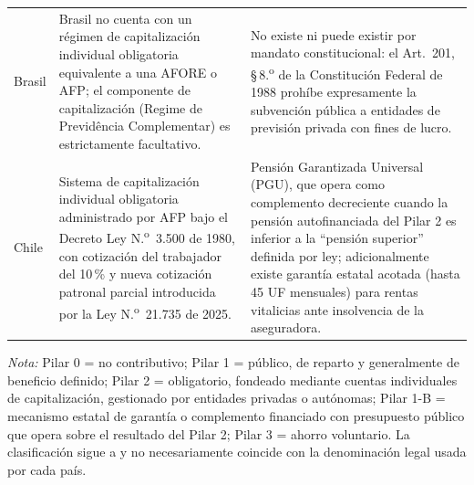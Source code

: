 \documentclass[12pt, letterpaper]{article}
\begin{document}
\begin{xltabular}{\textwidth}{P{2.1cm}Y Y}
Brasil &
Brasil no cuenta con un régimen de capitalización individual obligatoria equivalente a una AFORE o AFP; el componente de capitalización (Regime de Previdência Complementar) es estrictamente facultativo. &
No existe ni puede existir por mandato constitucional: el Art.\ 201, \S\,8.\textsuperscript{o} de la Constitución Federal de 1988 prohíbe expresamente la subvención pública a entidades de previsión privada con fines de lucro. \\

Chile &
Sistema de capitalización individual obligatoria administrado por AFP bajo el Decreto Ley N.\textsuperscript{o}~3.500 de 1980, con cotización del trabajador del 10\,\% y nueva cotización patronal parcial introducida por la Ley N.\textsuperscript{o}~21.735 de 2025. &
Pensión Garantizada Universal (PGU), que opera como complemento decreciente cuando la pensión autofinanciada del Pilar 2 es inferior a la ``pensión superior'' definida por ley; adicionalmente existe garantía estatal acotada (hasta 45 UF mensuales) para rentas vitalicias ante insolvencia de la aseguradora. \\

\end{xltabular}

\begin{small}
\noindent\textit{Nota:} Pilar 0 = no contributivo; Pilar 1 = público, de reparto y generalmente de beneficio definido; Pilar 2 = obligatorio, fondeado mediante cuentas individuales de capitalización, gestionado por entidades privadas o autónomas; Pilar 1-B = mecanismo estatal de garantía o complemento financiado con presupuesto público que opera sobre el resultado del Pilar 2; Pilar 3 = ahorro voluntario. La clasificación sigue a \citet{holzmann2005} y no necesariamente coincide con la denominación legal usada por cada país.
\end{small}
\end{document}
